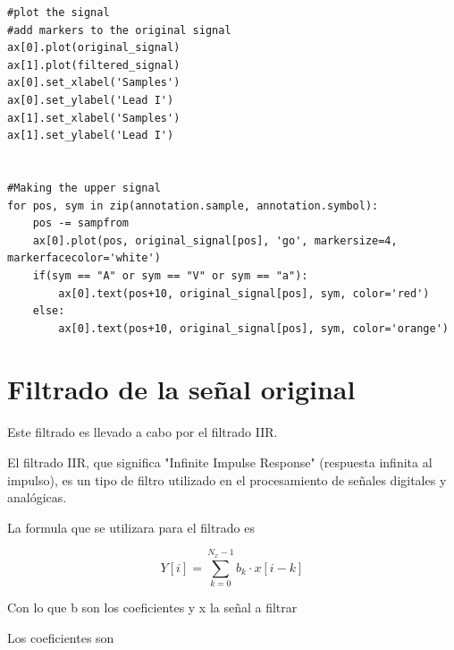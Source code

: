 \lstset{language=python, breaklines=true, basicstyle=\footnotesize}
\begin{lstlisting}[frame=single]
#plot the signal
#add markers to the original signal
ax[0].plot(original_signal)
ax[1].plot(filtered_signal)
ax[0].set_xlabel('Samples')
ax[0].set_ylabel('Lead I')
ax[1].set_xlabel('Samples')
ax[1].set_ylabel('Lead I')


#Making the upper signal
for pos, sym in zip(annotation.sample, annotation.symbol):
    pos -= sampfrom
    ax[0].plot(pos, original_signal[pos], 'go', markersize=4, markerfacecolor='white')
    if(sym == "A" or sym == "V" or sym == "a"):
        ax[0].text(pos+10, original_signal[pos], sym, color='red')
    else:
        ax[0].text(pos+10, original_signal[pos], sym, color='orange')
\end{lstlisting}

\section{Filtrado de la señal original}
Este filtrado es llevado a cabo por el filtrado IIR.

El filtrado IIR, que significa "Infinite Impulse Response" (respuesta infinita al impulso),
es un tipo de filtro utilizado en el procesamiento de señales digitales y analógicas.

La formula que se utilizara para el filtrado es

\[ Y[i] = \sum_{k=0}^{N_x -1} b_k \cdot x[i-k] \]

Con lo que b son los coeficientes y x la señal a filtrar

Los coeficientes son 

